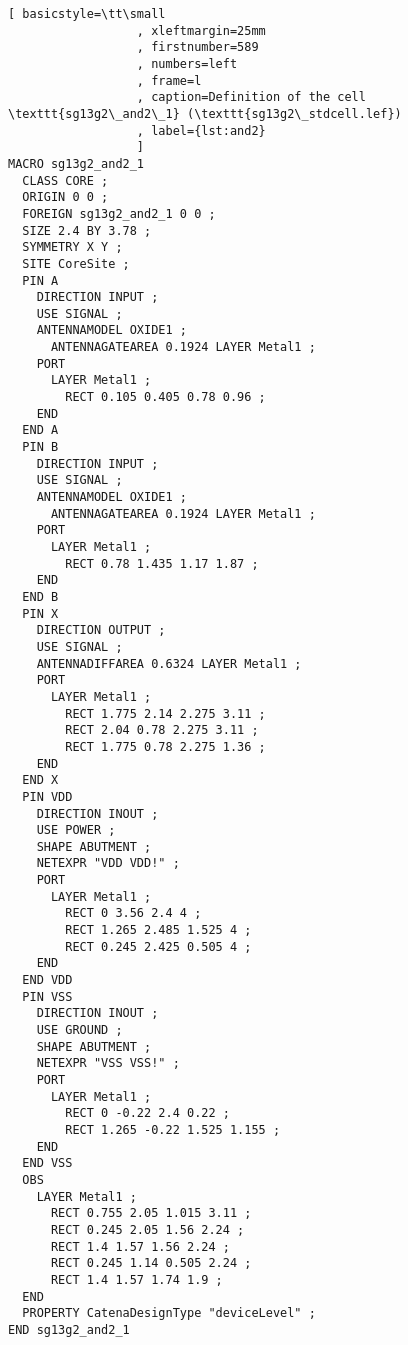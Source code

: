 \documentclass{article}[11pt]
\begin{document}
\begin{lstlisting}[ basicstyle=\tt\small
                  , xleftmargin=25mm
                  , firstnumber=589
                  , numbers=left
                  , frame=l
                  , caption=Definition of the cell \texttt{sg13g2\_and2\_1} (\texttt{sg13g2\_stdcell.lef})
                  , label={lst:and2}
                  ]
MACRO sg13g2_and2_1
  CLASS CORE ;
  ORIGIN 0 0 ;
  FOREIGN sg13g2_and2_1 0 0 ;
  SIZE 2.4 BY 3.78 ;
  SYMMETRY X Y ;
  SITE CoreSite ;
  PIN A
    DIRECTION INPUT ;
    USE SIGNAL ;
    ANTENNAMODEL OXIDE1 ;
      ANTENNAGATEAREA 0.1924 LAYER Metal1 ;
    PORT
      LAYER Metal1 ;
        RECT 0.105 0.405 0.78 0.96 ;
    END
  END A
  PIN B
    DIRECTION INPUT ;
    USE SIGNAL ;
    ANTENNAMODEL OXIDE1 ;
      ANTENNAGATEAREA 0.1924 LAYER Metal1 ;
    PORT
      LAYER Metal1 ;
        RECT 0.78 1.435 1.17 1.87 ;
    END
  END B
  PIN X
    DIRECTION OUTPUT ;
    USE SIGNAL ;
    ANTENNADIFFAREA 0.6324 LAYER Metal1 ;
    PORT
      LAYER Metal1 ;
        RECT 1.775 2.14 2.275 3.11 ;
        RECT 2.04 0.78 2.275 3.11 ;
        RECT 1.775 0.78 2.275 1.36 ;
    END
  END X
  PIN VDD
    DIRECTION INOUT ;
    USE POWER ;
    SHAPE ABUTMENT ;
    NETEXPR "VDD VDD!" ;
    PORT
      LAYER Metal1 ;
        RECT 0 3.56 2.4 4 ;
        RECT 1.265 2.485 1.525 4 ;
        RECT 0.245 2.425 0.505 4 ;
    END
  END VDD
  PIN VSS
    DIRECTION INOUT ;
    USE GROUND ;
    SHAPE ABUTMENT ;
    NETEXPR "VSS VSS!" ;
    PORT
      LAYER Metal1 ;
        RECT 0 -0.22 2.4 0.22 ;
        RECT 1.265 -0.22 1.525 1.155 ;
    END
  END VSS
  OBS
    LAYER Metal1 ;
      RECT 0.755 2.05 1.015 3.11 ;
      RECT 0.245 2.05 1.56 2.24 ;
      RECT 1.4 1.57 1.56 2.24 ;
      RECT 0.245 1.14 0.505 2.24 ;
      RECT 1.4 1.57 1.74 1.9 ;
  END
  PROPERTY CatenaDesignType "deviceLevel" ;
END sg13g2_and2_1
\end{lstlisting}
\end{document}
